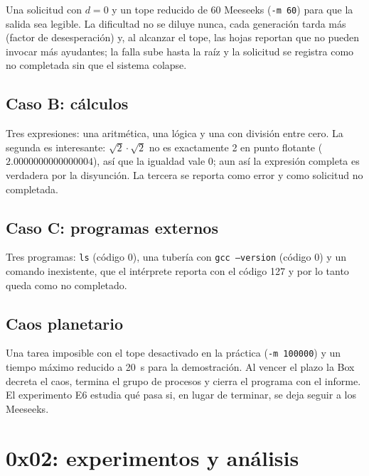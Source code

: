 Una solicitud con $d=0$ y un tope reducido de 60 Meeseeks (\texttt{-m 60}) para que la
salida sea legible. La dificultad no se diluye nunca, cada generación tarda más (factor de
desesperación) y, al alcanzar el tope, las hojas reportan que no pueden invocar más
ayudantes; la falla sube hasta la raíz y la solicitud se registra como no completada sin
que el sistema colapse.



\subsection{Caso B: cálculos}

Tres expresiones: una aritmética, una lógica y una con división entre cero. La segunda es
interesante: $\sqrt2\cdot\sqrt2$ no es exactamente 2 en punto flotante
($2.0000000000000004$), así que la igualdad vale 0; aun así la expresión completa es
verdadera por la disyunción. La tercera se reporta como error y como solicitud no
completada.



\subsection{Caso C: programas externos}

Tres programas: \texttt{ls} (código 0), una tubería con \texttt{gcc --version} (código 0) y un
comando inexistente, que el intérprete reporta con el código 127 y por lo tanto queda como
no completado.



\subsection{Caos planetario}

Una tarea imposible con el tope desactivado en la práctica (\texttt{-m 100000}) y un
tiempo máximo reducido a 20~s para la demostración. Al vencer el plazo la Box decreta el
caos, termina el grupo de procesos y cierra el programa con el informe. El experimento E6
estudia qué pasa si, en lugar de terminar, se deja seguir a los Meeseeks.



\section{0x02: experimentos y análisis}\label{sec:exp}

